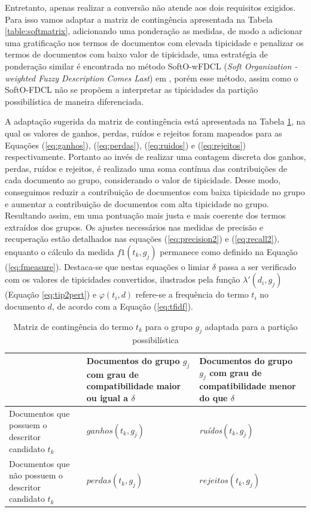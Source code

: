 Entretanto, apenas realizar a conversão não atende aos dois requisitos exigidos. Para isso
vamos adaptar a matriz de contingência apresentada na Tabela \ref{table:softmatrix}, adicionando uma
ponderação as medidas, de modo a adicionar uma gratificação nos termos de documentos com elevada
tipicidade e penalizar os termos de documentos com baixo valor de tipicidade, uma estratégia de
ponderação similar é encontrada no método SoftO-wFDCL ({\it Soft Organization - weighted Fuzzy
Description Comes Last}) em , porém esse método, assim como o SoftO-FDCL
não se propõem a interpretar as tipicidades da partição possibilística de maneira diferenciada.

A adaptação sugerida da matriz de contingência está apresentada na Tabela \ref{table:softmatrix2},
na qual os valores de ganhos, perdas, ruídos e rejeitos foram mapeados para as Equações
(\ref{eq:ganhos}), (\ref{eq:perdas}),  (\ref{eq:ruidos}) e  (\ref{eq:rejeitos}) respectivamente.
Portanto ao invés de realizar uma contagem discreta dos ganhos, perdas, ruídos e rejeitos, é
realizado uma soma contínua das contribuições de cada documento ao grupo, considerando o valor de
tipicidade. Desse modo, conseguimos reduzir a contribuição de documentos com baixa tipicidade no
grupo e aumentar a contribuição de documentos com alta tipicidade no grupo. Resultando assim, em uma
pontuação mais justa e mais coerente dos termos extraídos dos grupos. Os ajustes necessários nas
medidas de precisão e recuperação estão detalhados nas equações (\ref{eq:precision2}) e
(\ref{eq:recall2}), enquanto o cálculo da medida $f1(t_k,g_j)$ permanece como definido na Equação
(\ref{eq:fmeasure}). Destaca-se que nestas equações o limiar $\delta$ passa a ser verificado com os
valores de tipicidades convertidos, ilustrados pela função $\lambda'(d_i,g_j)$ (Equação
\ref{eq:tip2pert}) e $\varphi(t_i,d)$ refere-se a frequência do termo $t_i$ no documento $d$, de
acordo com a Equação (\ref{eq:tfidf}).

\begin{table}[!htp]
  \centering
  \begin{tabular}{ |p{5cm}|p{5cm}|p{5cm}|}
    \cline{2-3}
    \multicolumn{1}{p{5cm}|}{} & Documentos do grupo $g_j$ com grau de compatibilidade 
    maior ou igual a $\delta$ &
    Documentos do grupo $g_j$ com grau de compatibilidade menor do que $\delta$ \\
    \hline
    Documentos que possuem o descritor candidato $t_k$ & \parbox[c]{5cm}{\centering
  $ganhos(t_k,g_j)$} & \parbox[c]{5cm}{\centering \it ruídos\/$(t_k,g_j)$} \\
    \hline
    Documentos que não possuem o descritor candidato $t_k$ & \parbox[c]{5cm}{\centering
  $perdas(t_k,g_j)$} & \parbox[c]{5cm}{\centering $rejeitos(t_k,g_j)$} \\
    \hline
  \end{tabular}
  \caption{Matriz de contingência do termo $t_k$ para o grupo $g_j$ adaptada para a partição
  possibilística}
  \label{table:softmatrix2}
\end{table}

